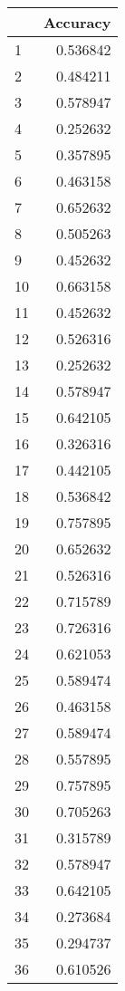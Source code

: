 \begin{tabular}{lr}
\toprule
{} &  Accuracy \\
\midrule
1  &  0.536842 \\
2  &  0.484211 \\
3  &  0.578947 \\
4  &  0.252632 \\
5  &  0.357895 \\
6  &  0.463158 \\
7  &  0.652632 \\
8  &  0.505263 \\
9  &  0.452632 \\
10 &  0.663158 \\
11 &  0.452632 \\
12 &  0.526316 \\
13 &  0.252632 \\
14 &  0.578947 \\
15 &  0.642105 \\
16 &  0.326316 \\
17 &  0.442105 \\
18 &  0.536842 \\
19 &  0.757895 \\
20 &  0.652632 \\
21 &  0.526316 \\
22 &  0.715789 \\
23 &  0.726316 \\
24 &  0.621053 \\
25 &  0.589474 \\
26 &  0.463158 \\
27 &  0.589474 \\
28 &  0.557895 \\
29 &  0.757895 \\
30 &  0.705263 \\
31 &  0.315789 \\
32 &  0.578947 \\
33 &  0.642105 \\
34 &  0.273684 \\
35 &  0.294737 \\
36 &  0.610526 \\
\bottomrule
\end{tabular}
